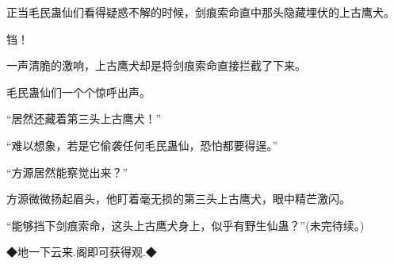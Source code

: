 \begin{this_body}
正当毛民蛊仙们看得疑惑不解的时候，剑痕索命直中那头隐藏埋伏的上古鹰犬。

铛！

一声清脆的激响，上古鹰犬却是将剑痕索命直接拦截了下来。

毛民蛊仙们一个个惊呼出声。

“居然还藏着第三头上古鹰犬！”

“难以想象，若是它偷袭任何毛民蛊仙，恐怕都要得逞。”

“方源居然能察觉出来？”

方源微微扬起眉头，他盯着毫无损的第三头上古鹰犬，眼中精芒激闪。

“能够挡下剑痕索命，这头上古鹰犬身上，似乎有野生仙蛊？”(未完待续。)

◆地一下云来.阁即可获得观.◆

\end{this_body}


